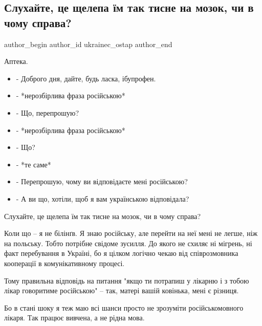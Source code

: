  
 
 
 
 
 
\subsection{Слухайте, це щелепа їм так тисне на мозок, чи в чому справа?}
\label{sec:24_06_2021.fb.ukrainec_ostap.1.apteka_jazyk}
 
\ifcmt
 author_begin
   author_id ukrainec_ostap
 author_end
\fi

Аптека.

\begin{itemize}
  \item - Доброго дня, дайте, будь ласка, ібупрофен.
  \item - *нерозбірлива фраза російською*
  \item - Що, перепрошую?
  \item - *нерозбірлива фраза російською*
  \item - Що?
  \item - *те саме*
  \item - Перепрошую, чому ви відповідаєте мені російською?
  \item - А ви що, хотіли, щоб я вам українською відповідала?
\end{itemize}

Слухайте, це щелепа їм так тисне на мозок, чи в чому справа?

Коли що – я не білінґв. Я знаю російську, але перейти на неї мені не легше, ніж
на польську. Тобто потрібне свідоме зусилля. До якого не схиляє ні мігрень, ні
факт перебування в Україні, бо я цілком логічно чекаю від співрозмовника
кооперації в комунікативному процесі.

Тому правильна відповідь на питання "якщо ти потрапиш у лікарню і з тобою лікар
говоритиме російською" – так, матері вашій ковінька, мені є різниця. 

Бо в стані шоку я теж маю всі шанси просто не зрозуміти російськомовного
лікаря. Так працює вивчена, а не рідна мова.

